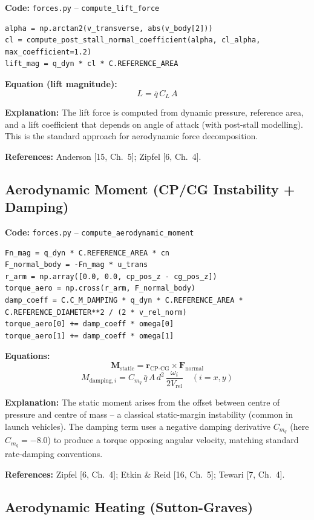 \documentclass[12pt,a4paper]{article}
\begin{document}
\textbf{Code:} \texttt{forces.py} – \texttt{compute\_lift\_force}
\begin{verbatim}
alpha = np.arctan2(v_transverse, abs(v_body[2]))
cl = compute_post_stall_normal_coefficient(alpha, cl_alpha, max_coefficient=1.2)
lift_mag = q_dyn * cl * C.REFERENCE_AREA
\end{verbatim}

\textbf{Equation (lift magnitude):}
\[
L = \bar{q}\,C_L\,A
\]

\textbf{Explanation:} The lift force is computed from dynamic pressure, reference area, and a lift coefficient that depends on angle of attack (with post-stall modelling). This is the standard approach for aerodynamic force decomposition.

\textbf{References:} Anderson [15, Ch.~5]; Zipfel [6, Ch.~4].

\subsection{Aerodynamic Moment (CP/CG Instability + Damping)}

\textbf{Code:} \texttt{forces.py} – \texttt{compute\_aerodynamic\_moment}
\begin{verbatim}
Fn_mag = q_dyn * C.REFERENCE_AREA * cn
F_normal_body = -Fn_mag * u_trans
r_arm = np.array([0.0, 0.0, cp_pos_z - cg_pos_z])
torque_aero = np.cross(r_arm, F_normal_body)
damp_coeff = C.C_M_DAMPING * q_dyn * C.REFERENCE_AREA * C.REFERENCE_DIAMETER**2 / (2 * v_rel_norm)
torque_aero[0] += damp_coeff * omega[0]
torque_aero[1] += damp_coeff * omega[1]
\end{verbatim}

\textbf{Equations:}
\[
\mathbf{M}_{\text{static}} = \mathbf{r}_{\text{CP-CG}} \times \mathbf{F}_{\text{normal}}
\]
\[
M_{\text{damping},i} = C_{m_q}\,\bar{q}\,A\,d^2\,\frac{\omega_i}{2V_{\text{rel}}}\quad (i=x,y)
\]

\textbf{Explanation:} The static moment arises from the offset between centre of pressure and centre of mass -- a classical static-margin instability (common in launch vehicles). The damping term uses a negative damping derivative $C_{m_q}$ (here $C_{m_q} = -8.0$) to produce a torque opposing angular velocity, matching standard rate-damping conventions.

\textbf{References:} Zipfel [6, Ch.~4]; Etkin \& Reid [16, Ch.~5]; Tewari [7, Ch.~4].

\subsection{Aerodynamic Heating (Sutton-Graves)}
\end{document}
